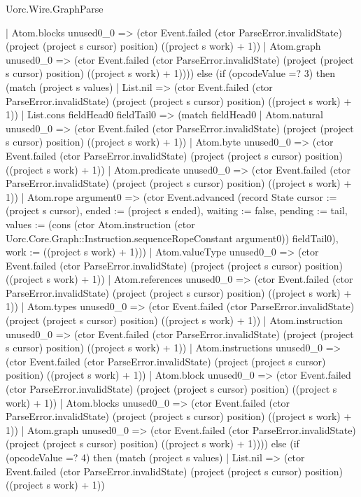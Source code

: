 \begin{lexlean}{Uorc.Wire.GraphParse}
\begin{semanticmodule}
{          | Atom.blocks unused0_0 => (ctor Event.failed (ctor ParseError.invalidState) (project (project s cursor) position) ((project s work) + 1))
          | Atom.graph unused0_0 => (ctor Event.failed (ctor ParseError.invalidState) (project (project s cursor) position) ((project s work) + 1)))) else (if (opcodeValue =? 3) then (match (project s values)
        | List.nil => (ctor Event.failed (ctor ParseError.invalidState) (project (project s cursor) position) ((project s work) + 1))
        | List.cons fieldHead0 fieldTail0 => (match fieldHead0
          | Atom.natural unused0_0 => (ctor Event.failed (ctor ParseError.invalidState) (project (project s cursor) position) ((project s work) + 1))
          | Atom.byte unused0_0 => (ctor Event.failed (ctor ParseError.invalidState) (project (project s cursor) position) ((project s work) + 1))
          | Atom.predicate unused0_0 => (ctor Event.failed (ctor ParseError.invalidState) (project (project s cursor) position) ((project s work) + 1))
          | Atom.rope argument0 => (ctor Event.advanced (record State {cursor := (project s cursor), ended := (project s ended), waiting := false, pending := tail, values := (cons (ctor Atom.instruction (ctor Uorc.Core.Graph::Instruction.sequenceRopeConstant argument0)) fieldTail0), work := ((project s work) + 1)}))
          | Atom.valueType unused0_0 => (ctor Event.failed (ctor ParseError.invalidState) (project (project s cursor) position) ((project s work) + 1))
          | Atom.references unused0_0 => (ctor Event.failed (ctor ParseError.invalidState) (project (project s cursor) position) ((project s work) + 1))
          | Atom.types unused0_0 => (ctor Event.failed (ctor ParseError.invalidState) (project (project s cursor) position) ((project s work) + 1))
          | Atom.instruction unused0_0 => (ctor Event.failed (ctor ParseError.invalidState) (project (project s cursor) position) ((project s work) + 1))
          | Atom.instructions unused0_0 => (ctor Event.failed (ctor ParseError.invalidState) (project (project s cursor) position) ((project s work) + 1))
          | Atom.block unused0_0 => (ctor Event.failed (ctor ParseError.invalidState) (project (project s cursor) position) ((project s work) + 1))
          | Atom.blocks unused0_0 => (ctor Event.failed (ctor ParseError.invalidState) (project (project s cursor) position) ((project s work) + 1))
          | Atom.graph unused0_0 => (ctor Event.failed (ctor ParseError.invalidState) (project (project s cursor) position) ((project s work) + 1)))) else (if (opcodeValue =? 4) then (match (project s values)
        | List.nil => (ctor Event.failed (ctor ParseError.invalidState) (project (project s cursor) position) ((project s work) + 1))
}
\end{semanticmodule}
\end{lexlean}
